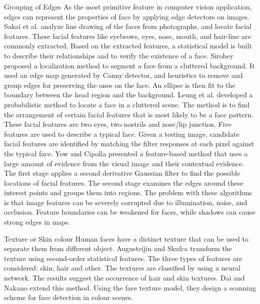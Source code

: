 Grouping of Edges
As the most primitive feature in computer vision application, edges can represent the properties of face by applying edge detectors on images. Sakai et al. \cite{Sakai1972} analyze line drawing of the faces from photographs, and locate facial features.  These facial features like eyebrows, eyes, nose, mouth, and hair-line are commonly extracted. Based on the extracted features, a statistical model is built to describe their relationships and to verify the existence of a face. Sirohey \cite{Sirohey1993} proposed a localization method to segment a face from a cluttered background. It used an edge map generated by Canny detector, and heuristics to remove and group edges for preserving the ones on the face. An ellipse is then fit to the boundary between the head region and the background. Leung et al. \cite{Leung1995} developed a probabilistic method to locate a face in a cluttered scene. The method is to find the arrangement of certain facial features that is most likely to be a face pattern. These facial features are two eyes, two nostrils and nose/lip junction. Five features are used to describe a typical face. Given a testing image, candidate facial features are identified by matching the filter responses at each pixel against the typical face. Yow and Cipolla \cite{Yow1997} presented a feature-based method that uses a large amount of evidence from the visual image and their contextual evidence. The first stage applies a second derivative Gaussian filter to find the possible locations of facial features. The second stage examines the edges around these interest points and groups them into regions. The problem with these algorithms is that image features can be severely corrupted due to illumination, noise, and occlusion. Feature boundaries can be weakened for faces, while shadows can cause strong edges in maps. 

Texture or Skin colour
Human faces have a distinct texture that can be used to separate them from different object. Augusteijin and Skufca \cite{} transform the texture using second-order statistical features. The three types of features are considered: skin, hair and other. The textures are classified by using a neural network. The results suggest the occurrence of hair and skin textures. Dai and Nakano \cite{} extend this method. Using the face texture model, they design a scanning scheme for face detection in colour scenes. 

